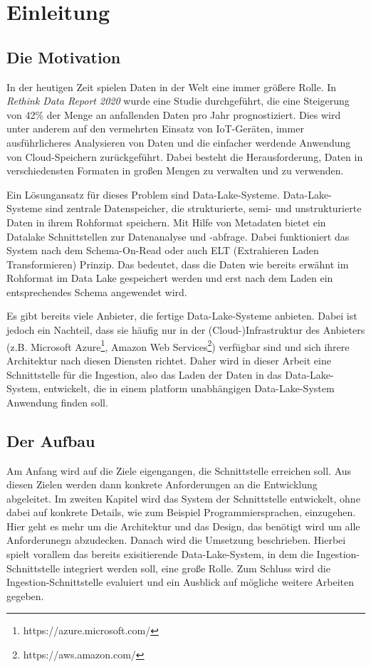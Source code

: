 \chapter{Einleitung}

\section{Die Motivation}
In der heutigen Zeit spielen Daten in der Welt eine immer größere Rolle.
In \textit{Rethink Data Report 2020} \textcite{rethink_data_2020} wurde eine Studie durchgeführt, die eine Steigerung von 42\% der Menge an anfallenden Daten pro Jahr prognostiziert.
Dies wird unter anderem auf den vermehrten Einsatz von IoT-Geräten, immer ausführlicheres Analysieren von Daten und die einfacher werdende Anwendung von Cloud-Speichern zurückgeführt.
Dabei besteht die Herausforderung, Daten in verschiedensten Formaten in großen Mengen zu verwalten und zu verwenden.

Ein Lösungansatz für dieses Problem sind Data-Lake-Systeme.
Data-Lake-Systeme sind zentrale Datenspeicher, die strukturierte, semi- und unstrukturierte Daten in ihrem Rohformat speichern.
Mit Hilfe von Metadaten bietet ein Datalake Schnittstellen zur Datenanalyse und -abfrage.
Dabei funktioniert das System nach dem Schema-On-Read oder auch ELT (Extrahieren Laden Transformieren) Prinzip.
Das bedeutet, dass die Daten wie bereits erwähnt im Rohformat im Data Lake gespeichert werden und erst nach dem Laden ein entsprechendes Schema angewendet wird.

Es gibt bereits viele Anbieter, die fertige Data-Lake-Systeme anbieten.
Dabei ist jedoch ein Nachteil, dass sie häufig nur in der (Cloud-)Infrastruktur des Anbieters (z.B. Microsoft Azure\footnote{https://azure.microsoft.com/}, Amazon Web Services\footnote{https://aws.amazon.com/}) verfügbar sind und sich ihrere Architektur nach diesen Diensten richtet.
Daher wird in dieser Arbeit eine Schnittstelle für die Ingestion, also das Laden der Daten in das Data-Lake-System, entwickelt, die in einem platform unabhängigen Data-Lake-System Anwendung finden soll.

\section{Der Aufbau}
Am Anfang wird auf die Ziele eigengangen, die Schnittstelle erreichen soll.
Aus diesen Zielen werden dann konkrete Anforderungen an die Entwicklung abgeleitet.
Im zweiten Kapitel wird das System der Schnittstelle entwickelt, ohne dabei auf konkrete Details, wie zum Beispiel Programmiersprachen, einzugehen.
Hier geht es mehr um die Architektur und das Design, das benötigt wird um alle Anforderunegn abzudecken.
Danach wird die Umsetzung beschrieben.
Hierbei spielt vorallem das bereits exisitierende Data-Lake-System, in dem die Ingestion-Schnittstelle integriert werden soll, eine große Rolle.
Zum Schluss wird die Ingestion-Schnittstelle evaluiert und ein Ausblick auf mögliche weitere Arbeiten gegeben.


